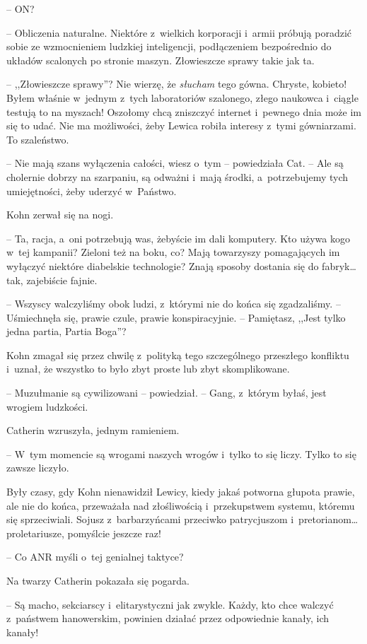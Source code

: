 \documentclass[oneside,polish,11pt,sfheadings]{mwbk}
\begin{document}
-- ON?

-- Obliczenia naturalne. Niektóre z~wielkich korporacji i~armii próbują
poradzić sobie ze wzmocnieniem ludzkiej inteligencji, podłączeniem
bezpośrednio do układów scalonych po stronie maszyn. Złowieszcze sprawy
takie jak ta.

-- ,,Złowieszcze sprawy''? Nie wierzę, że \emph{słucham} tego gówna.
Chryste, kobieto! Byłem właśnie w~jednym z~tych laboratoriów szalonego,
złego naukowca i~ciągle testują to na myszach! Oszołomy chcą zniszczyć
internet i~pewnego dnia może im się to udać. Nie ma możliwości, żeby
Lewica robiła interesy z~tymi gówniarzami. To szaleństwo.

-- Nie mają szans wyłączenia całości, wiesz o~tym -- powiedziała Cat. --
Ale są cholernie dobrzy na szarpaniu, są odważni i~mają środki, a~potrzebujemy tych umiejętności, żeby uderzyć w~Państwo.

Kohn zerwał się na nogi.

-- Ta, racja, a~oni potrzebują was, żebyście im dali komputery. Kto używa
kogo w~tej kampanii? Zieloni też na boku, co? Mają towarzyszy
pomagających im wyłączyć niektóre diabelskie technologie? Znają sposoby
dostania się do fabryk\ldots tak, zajebiście fajnie.

-- Wszyscy walczyliśmy obok ludzi, z~którymi nie do końca się
zgadzaliśmy. -- Uśmiechnęła się, prawie czule, prawie konspiracyjnie. --
Pamiętasz, ,,Jest tylko jedna partia, Partia Boga''?

Kohn zmagał się przez chwilę z~polityką tego szczególnego przeszłego
konfliktu i~uznał, że wszystko to było zbyt proste lub zbyt
skomplikowane.

-- Muzułmanie są cywilizowani -- powiedział. -- Gang, z~którym byłaś, jest
wrogiem ludzkości.

Catherin wzruszyła, jednym ramieniem. 

-- W~tym momencie są wrogami
naszych wrogów i~tylko to się liczy. Tylko to się zawsze liczyło.

Były czasy, gdy Kohn nienawidził Lewicy, kiedy jakaś potworna głupota
prawie, ale nie do końca, przeważała nad złośliwością i~przekupstwem
systemu, któremu się sprzeciwiali. Sojusz z~barbarzyńcami przeciwko
patrycjuszom i~pretorianom\ldots proletariusze, pomyślcie jeszcze raz!

-- Co ANR myśli o~tej genialnej taktyce?

Na twarzy Catherin pokazała się pogarda.

-- Są macho, sekciarscy i~elitarystyczni jak zwykle. Każdy, kto chce
walczyć z~państwem hanowerskim, powinien działać przez odpowiednie
kanały, ich kanały!
\end{document}
